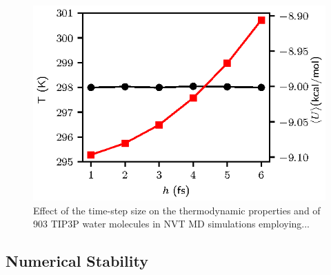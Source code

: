 \documentclass[
journal=jctcce,
layout=twocolumn
]{achemso}
\begin{document}
\begin{figure}
	\includegraphics{Figures/thermodynamic_properties_intro.eps}
    \caption{Effect of the time-step size on the thermodynamic properties and of 903 TIP3P\cite{Jorgensen_1983} water molecules in NVT MD simulations employing...}
	\label{fig:props_k_m}
\end{figure}

\subsection*{Numerical Stability}
\end{document}
